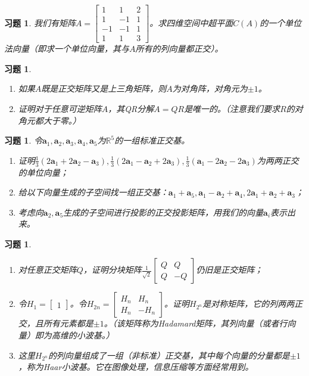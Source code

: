 \documentclass[UTF8]{ctexart}
\newtheorem{ex}[thm]{习题}
\begin{document}
\begin{ex}
我们有矩阵$A=\begin{bmatrix}1&1&2\\1&-1&1\\-1&-1&1\\1&1&3\end{bmatrix}$。求四维空间中超平面$C(A)$的一个单位法向量（即求一个单位向量，其与$A$所有的列向量都正交）。
\end{ex}



\begin{ex}

\begin{enumerate}
\item 如果$A$既是正交矩阵又是上三角矩阵，则$A$为对角阵，对角元为$\pm 1$。
\item 证明对于任意可逆矩阵$A$，其QR分解$A=QR$是唯一的。（注意我们要求$R$的对角元都大于零。）
\end{enumerate}
\end{ex}


\begin{ex}
令$\bm a_1,\bm a_2,\bm a_3,\bm a_4,\bm a_5$为$\mathbb{R}^5$的一组标准正交基。
\begin{enumerate}
\item 证明$\frac{1}{3}(2\bm a_1+2\bm a_2-\bm a_3),\frac{1}{3}(2\bm a_1-\bm a_2+2\bm a_3),\frac{1}{3}(\bm a_1-2\bm a_2-2\bm a_3)$为两两正交的单位向量；
\item 给以下向量生成的子空间找一组正交基：$\bm a_1+\bm a_5, \bm a_1-\bm a_2+\bm a_4, 2\bm a_1+\bm a_2+\bm a_3$；
\item 考虑向$\bm a_2,\bm a_5$生成的子空间进行投影的正交投影矩阵，用我们的向量$\bm a_i$表示出来。
\end{enumerate}
\end{ex}



\begin{ex}
\begin{enumerate}
\item 对任意正交矩阵$Q$，证明分块矩阵$\frac{1}{\sqrt{2}}\begin{bmatrix}Q&Q\\Q&-Q\end{bmatrix}$仍旧是正交矩阵；
\item 令$H_1=\begin{bmatrix}1\end{bmatrix}$。令$H_{2n}=\begin{bmatrix}H_n&H_n\\H_n&-H_n\end{bmatrix}$。证明$H_{2^n}$是对称矩阵，它的列两两正交，且所有元素都是$\pm 1$。（该矩阵称为Hadamard矩阵，其列向量（或者行向量）即为高维的小波基。）
\item[注记：] 这里$H_{2^n}$的列向量组成了一组（非标准）正交基，其中每个向量的分量都是$\pm 1$，称为Haar小波基。它在图像处理，信息压缩等方面经常用到。
\end{enumerate}
\end{ex}
\end{document}
